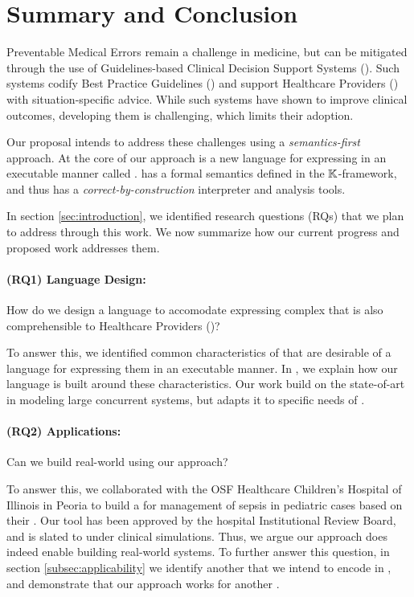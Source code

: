 \section{Summary and Conclusion}

Preventable Medical Errors remain a challenge in medicine, but
can be mitigated through the use of Guidelines-based Clinical Decision Support
Systems (\CDSSs{}). Such systems codify Best Practice Guidelines (\BPGs{}) and
support Healthcare Providers (\HCPs) with situation-specific advice.
While such systems have shown to improve clinical outcomes, developing
them is challenging, which limits their adoption.

Our proposal intends to address these challenges using a \emph{semantics-first}
approach. At the core of our approach is a new language for expressing
\BPGs{} in an executable manner called \MediK{}. \MediK{} has a formal semantics
defined in the $\mathbb{K}$-framework, and thus has a \emph{correct-by-construction}
interpreter and analysis tools.

In section \ref{sec:introduction}, we identified research questions (RQs)
that we plan to address through this work. We now summarize how our
current progress and proposed work addresses them.

\paragraph{(RQ1) Language Design:} How do we design a language to accomodate
expressing complex \BPGs{} that is also comprehensible to Healthcare Providers
(\HCPs{})?

To answer this, we identified common characteristics of \BPGs{} that are
desirable of a language for expressing them in an executable manner.
In \cite{SaxenaFMCAD23}, we explain how our language is built around
these characteristics. Our work build on the state-of-art in modeling
large concurrent systems, but adapts it to specific needs of \BPGs{}.

\paragraph{(RQ2) Applications:} Can we build real-world \CDSSs{} using our
approach?

To answer this, we collaborated with the OSF Healthcare Children's Hospital of Illinois
in Peoria to build a \CDSS{} for management of sepsis in pediatric
cases based on their \BPG{}. Our tool has been approved by the hospital
Institutional Review Board, and is slated to under clinical simulations.
Thus, we argue our approach does indeed enable building real-world systems.
To further answer this question, in section \ref{subsec:applicability} we
identify another \BPG{} that we intend to encode in \MediK{}, and demonstrate
that our approach works for another \BPG{}.

